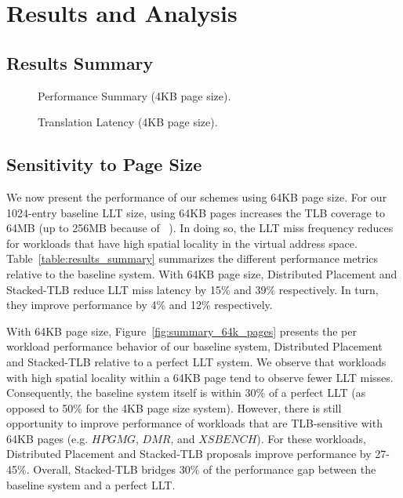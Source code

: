 
% 

\section{Results and Analysis} 
\label{sec:result}

\subsection{Results Summary}

\begin{figure}[tp] 
\vspace{-0 in} \centering
\centerline{}

\caption{\small Performance Summary (4KB page size).\normalsize}
\label{fig:summary_4k_pages} 
\vspace{0.1 in}
\end{figure}

\begin{figure}[tp] 
\vspace{-0 in} \centering
\centerline{}

\caption{\small Translation Latency (4KB page size).\normalsize}
\label{fig:summary_4k_pages} 
\vspace{-0. in}
\end{figure}

\subsection{Sensitivity to Page Size}

\noindent We now present the performance of our schemes using 64KB
page size. For our 1024-entry baseline LLT size, using 64KB pages
increases the TLB coverage to 64MB (up to 256MB because of
~\cite{COLT}). In doing so, the LLT miss frequency reduces for
workloads that have high spatial locality in the virtual address
space. Table~\ref{table:results_summary} summarizes the different
performance metrics relative to the baseline system. With 64KB page
size, Distributed Placement and Stacked-TLB reduce LLT miss latency by
15\% and 39\% respectively. In turn, they improve performance by 4\%
and 12\% respectively.

With 64KB page size, Figure~\ref{fig:summary_64k_pages} presents the
per workload performance behavior of our baseline system, Distributed
Placement and Stacked-TLB relative to a perfect LLT system. We observe
that workloads with high spatial locality within a 64KB page tend to
observe fewer LLT misses. Consequently, the baseline system itself is
within 30\% of a perfect LLT (as opposed to 50\% for the 4KB page size
system). However, there is still opportunity to improve performance of
workloads that are TLB-sensitive with 64KB pages (e.g. $HPGMG$, $DMR$,
and $XSBENCH$). For these workloads, Distributed Placement and
Stacked-TLB proposals improve performance by 27-45\%. Overall,
Stacked-TLB bridges 30\% of the performance gap between the baseline
system and a perfect LLT.


